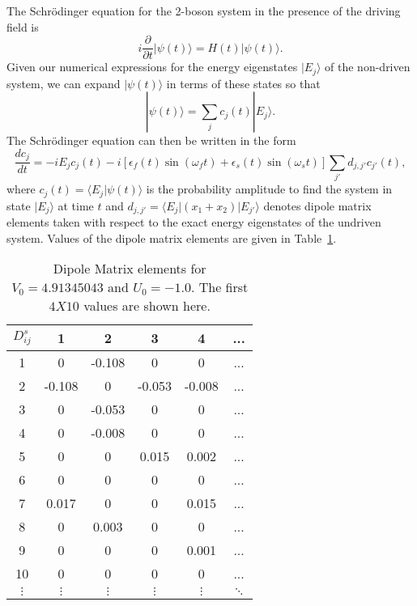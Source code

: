 \documentclass{article}
\begin{document}
The  Schr\"{o}dinger equation for the 2-boson system in the presence of the driving field is
%
\begin{equation}
i\frac{\partial}{\partial t}\vert \psi(t)\rangle=H(t)\vert \psi(t)\rangle .
\end{equation}
%
Given our numerical expressions for the energy eigenstates $|E_j{\rangle}$ of the non-driven  system, we can expand $|\psi(t)\rangle$ in terms of these states so that
%
\begin{equation}
|\psi(t)\rangle = \sum_jc_j(t) |E_j\rangle.
\end{equation}
%
The Schr\"odinger equation can then be written in the form
%
\begin{equation}
\frac{dc_j}{dt} =-iE_jc_j(t)-i[ \epsilon_f(t) \sin(\omega_ft) 
+\epsilon_s(t) \sin(\omega_st)] \sum_{j'}d_{j,j'}c_{j'}(t),
\label{eq:schroedinger}
\end{equation}
%
where $c_j(t)=\langle E_j|\psi(t)\rangle$ is the probability amplitude to find the system in state $|E_j\rangle$ at time $t$ and $d_{j,j'}={\langle}E_j|(x_1+x_2)|E_{j'}{\rangle}$ denotes dipole matrix elements taken with respect to the exact energy eigenstates of the undriven system. Values of the dipole matrix elements are given in Table~\ref{tabA}.

\begin{table}
\begin{center}
\begin{tabular}{|c|ccccc}
$D^s_{ij}$ & 1& 2& 3& 4& ...\\
\hline
1& 0& -0.108& 0& 0& ...\\
2& -0.108& 0& -0.053& -0.008&  ...\\
3& 0& -0.053& 0& 0&... \\
4& 0& -0.008& 0& 0&   ... \\
5& 0& 0& 0.015& 0.002&   ... \\
6& 0& 0& 0& 0&   ... \\
7& 0.017& 0& 0& 0.015&  ... \\
8& 0& 0.003& 0& 0&   ...\\
9& 0& 0& 0& 0.001& ... \\
10& 0& 0& 0& 0&   ... \\
$\vdots$& $\vdots$& $\vdots$& $\vdots$& $\vdots$& $\ddots$\\
\end{tabular}
\caption{Dipole Matrix elements for $V_0=4.91345043$ and $U_0=-1.0$. The first $4 X 10$ values are shown here. }
\label{tabA}
\end{center}
\end{table}
%
\end{document}
